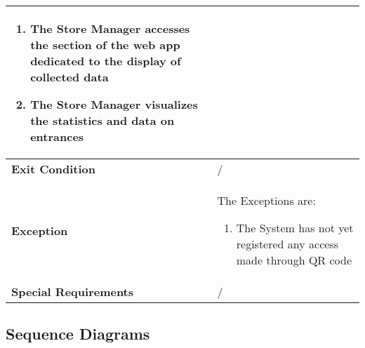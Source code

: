 \begin{enumerate}
{\begin{longtable}{|L{4cm}|L{10cm}|}
\begin{enumerate}
                        \item The Store Manager accesses the section of the web app dedicated to the display of collected data
                        \item The Store Manager visualizes the statistics and data on entrances
                    \end{enumerate} \\
                \hline
                \textbf{Exit Condition} & / \\
                \hline
                \textbf{Exception} & The Exceptions are: \begin{enumerate}
                        \item The System has not yet registered any access made through QR code
                    \end{enumerate} \\
                \hline
                \textbf{Special Requirements} & / \\
                \hline
            \end{longtable}}            
        \end{enumerate}

\subsection{Sequence Diagrams}